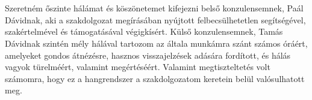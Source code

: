 \chapter*{\koszonetnyilvanitas}
Szeretném őszinte hálámat és köszönetemet kifejezni belső konzulensemnek, Paál Dávidnak, aki a szakdolgozat
megírásában nyújtott felbecsülhetetlen segítségével, szakértelmével és támogatásával végigkísért.
Külső konzulensemnek, Tamás Dávidnak szintén mély hálával tartozom az általa munkámra szánt számos óráért, 
amelyeket gondos átnézésre, hasznos visszajelzések adására fordított, és hálás vagyok türelméért, valamint megértéséért. Valamint
megtiszteltetés volt számomra, hogy ez a hangrendszer a szakdolgozatom keretein belül valósulhatott meg.

